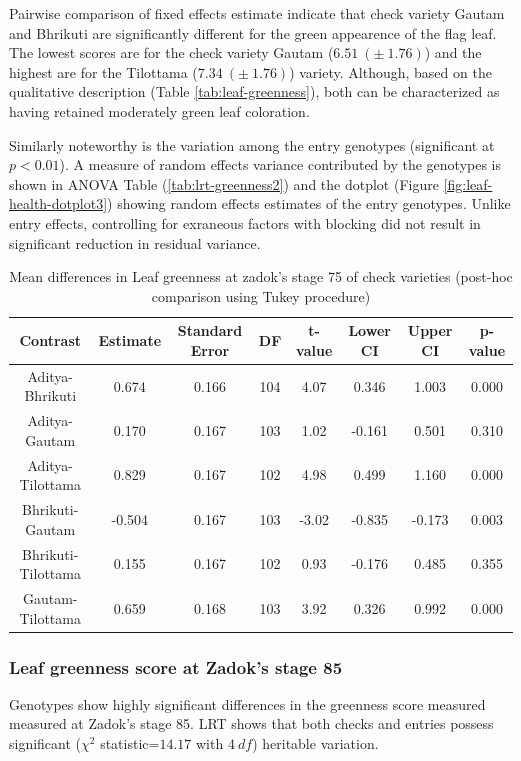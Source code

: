 \documentclass[12pt,oneside]{dukestatscithesis} %
\theoremstyle{definition}
\theoremstyle{definition}
\theoremstyle{definition}
\theoremstyle{remark}
\begin{document}
Pairwise comparison of fixed effects estimate indicate that check
variety Gautam and Bhrikuti are significantly different for the green
appearence of the flag leaf. The lowest scores are for the check variety
Gautam (\(6.51\ (\pm\ 1.76)\)) and the highest are for the Tilottama
(\(7.34\ (\pm\ 1.76)\)) variety. Although, based on the qualitative
description (Table \ref{tab:leaf-greenness}), both can be characterized
as having retained moderately green leaf coloration.

Similarly noteworthy is the variation among the entry genotypes
(significant at \(p < 0.01\)). A measure of random effects variance
contributed by the genotypes is shown in ANOVA Table
(\ref{tab:lrt-greenness2}) and the dotplot (Figure
\ref{fig:leaf-health-dotplot3}) showing random effects estimates of the
entry genotypes. Unlike entry effects, controlling for exraneous factors
with blocking did not result in significant reduction in residual
variance.
\begin{table}[H]

\caption{\label{tab:leaf-health-meanconf-tab3}Mean differences in Leaf greenness at zadok's stage 75 of check varieties (post-hoc comparison using Tukey procedure)}
\centering
\begin{tabular}[t]{cccccccc}
\toprule
Contrast & Estimate & Standard Error & DF & t-value & Lower CI & Upper CI & p-value\\
\midrule
Aditya-Bhrikuti & 0.674 & 0.166 & 104 & 4.07 & 0.346 & 1.003 & 0.000\\
Aditya-Gautam & 0.170 & 0.167 & 103 & 1.02 & -0.161 & 0.501 & 0.310\\
Aditya-Tilottama & 0.829 & 0.167 & 102 & 4.98 & 0.499 & 1.160 & 0.000\\
Bhrikuti-Gautam & -0.504 & 0.167 & 103 & -3.02 & -0.835 & -0.173 & 0.003\\
Bhrikuti-Tilottama & 0.155 & 0.167 & 102 & 0.93 & -0.176 & 0.485 & 0.355\\
Gautam-Tilottama & 0.659 & 0.168 & 103 & 3.92 & 0.326 & 0.992 & 0.000\\
\bottomrule
\end{tabular}
\end{table}
\subsubsection{Leaf greenness score at Zadok's stage
85}\label{leaf-greenness-score-at-zadoks-stage-85}

Genotypes show highly significant differences in the greenness score
measured measured at Zadok's stage 85. LRT shows that both checks and
entries possess significant (\(\chi^2\) statistic=\(14.17\) with
\(4\ df\)) heritable variation.
\end{document}
